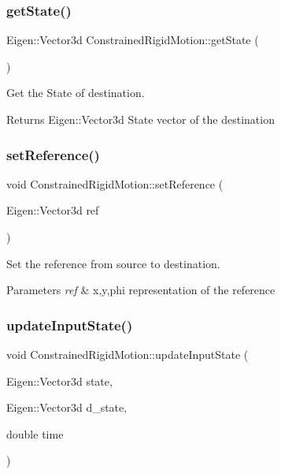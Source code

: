 \subsubsection{\texorpdfstring{get\+State()}{getState()}}
{\footnotesize\ttfamily Eigen\+::\+Vector3d Constrained\+Rigid\+Motion\+::get\+State (\begin{DoxyParamCaption}{ }\end{DoxyParamCaption})}



Get the State of destination. 

\begin{DoxyReturn}{Returns}
Eigen\+::\+Vector3d State vector of the destination 
\end{DoxyReturn}
\mbox{\label{group__RigidMotion_gac71f6e395c1d63f54cfb837b5526236b}} 
\subsubsection{\texorpdfstring{set\+Reference()}{setReference()}}
{\footnotesize\ttfamily void Constrained\+Rigid\+Motion\+::set\+Reference (\begin{DoxyParamCaption}\item[{Eigen\+::\+Vector3d}]{ref }\end{DoxyParamCaption})}



Set the reference from source to destination. 


\begin{DoxyParams}{Parameters}
{\em ref} & x,y,phi representation of the reference \\
\hline
\end{DoxyParams}
\mbox{\label{group__RigidMotion_ga80649fcba3aed41550ba463f405d051b}} 
\subsubsection{\texorpdfstring{update\+Input\+State()}{updateInputState()}}
{\footnotesize\ttfamily void Constrained\+Rigid\+Motion\+::update\+Input\+State (\begin{DoxyParamCaption}\item[{Eigen\+::\+Vector3d}]{state,  }\item[{Eigen\+::\+Vector3d}]{d\+\_\+state,  }\item[{double}]{time }\end{DoxyParamCaption})}



